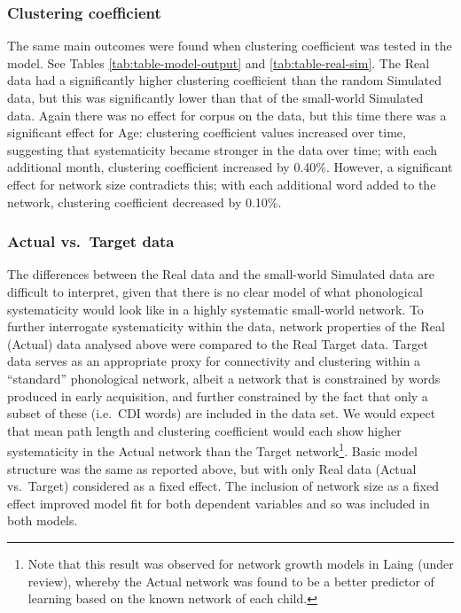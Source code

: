 \documentclass[
  man]{apa6}
\begin{document}
\hypertarget{clustering-coefficient}{%
\subsubsection{Clustering coefficient}\label{clustering-coefficient}}

The same main outcomes were found when clustering coefficient was tested in the model. See Tables \ref{tab:table-model-output} and \ref{tab:table-real-sim}. The Real data had a significantly higher clustering coefficient than the random Simulated data, but this was significantly lower than that of the small-world Simulated data. Again there was no effect for corpus on the data, but this time there was a significant effect for Age: clustering coefficient values increased over time, suggesting that systematicity became stronger in the data over time; with each additional month, clustering coefficient increased by 0.40\%. However, a significant effect for network size contradicts this; with each additional word added to the network, clustering coefficient decreased by 0.10\%.

\hypertarget{actual-vs.-target-data}{%
\subsubsection{Actual vs.~Target data}\label{actual-vs.-target-data}}

The differences between the Real data and the small-world Simulated data are difficult to interpret, given that there is no clear model of what phonological systematicity would look like in a highly systematic small-world network. To further interrogate systematicity within the data, network properties of the Real (Actual) data analysed above were compared to the Real Target data. Target data serves as an appropriate proxy for connectivity and clustering within a ``standard'' phonological network, albeit a network that is constrained by words produced in early acquisition, and further constrained by the fact that only a subset of these (i.e.~CDI words) are included in the data set. We would expect that mean path length and clustering coefficient would each show higher systematicity in the Actual network than the Target network\footnote{Note that this result was observed for network growth models in Laing (under review), whereby the Actual network was found to be a better predictor of learning based on the known network of each child.}. Basic model structure was the same as reported above, but with only Real data (Actual vs.~Target) considered as a fixed effect. The inclusion of network size as a fixed effect improved model fit for both dependent variables and so was included in both models.
\end{document}
